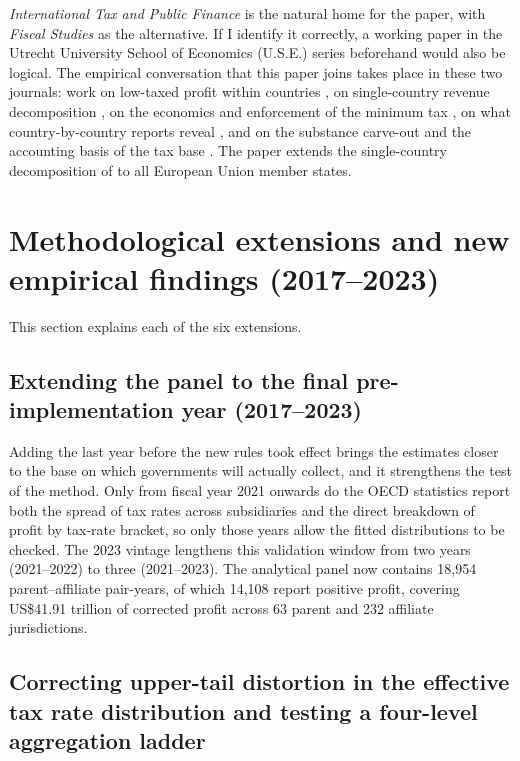\documentclass[11pt,a4paper]{article}
\newcommand{\usd}{US\$}
\begin{document}
\emph{International Tax and Public Finance} is the natural home for the paper, with \emph{Fiscal Studies} as the alternative. If I identify it correctly, a working paper in the Utrecht University School of Economics (U.S.E.) series beforehand would also be logical. The empirical conversation that this paper joins takes place in these two journals: work on low-taxed profit within countries \citep{hugger2026}, on single-country revenue decomposition \citep{boukal2026}, on the economics and enforcement of the minimum tax \citep{schjelderup2024,hindriks2026}, on what country-by-country reports reveal \citep{godar2024,tuinsma2025}, and on the substance carve-out and the accounting basis of the tax base \citep{devereux2023,hanlon2023}. The paper extends the single-country decomposition of \citet{boukal2026} to all European Union member states.

\section[Methodological extensions and new findings]{Methodological extensions and new empirical findings (2017–2023)}

This section explains each of the six extensions.

\subsection{Extending the panel to the final pre-implementation year (2017–2023)}

Adding the last year before the new rules took effect brings the estimates closer to the base on which governments will actually collect, and it strengthens the test of the method. Only from fiscal year 2021 onwards do the OECD statistics report both the spread of tax rates across subsidiaries and the direct breakdown of profit by tax-rate bracket, so only those years allow the fitted distributions to be checked. The 2023 vintage lengthens this validation window from two years (2021–2022) to three (2021–2023). The analytical panel now contains 18,954 parent–affiliate pair-years, of which 14,108 report positive profit, covering \usd41.91 trillion of corrected profit across 63 parent and 232 affiliate jurisdictions.

\subsection{Correcting upper-tail distortion in the effective tax rate distribution and testing a four-level aggregation ladder}
\end{document}
